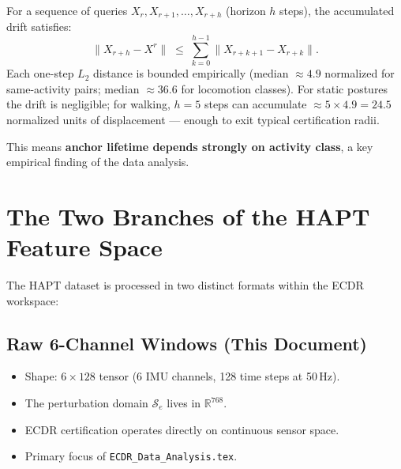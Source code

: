 \documentclass[11pt, a4paper]{article}
\theoremstyle{definition}
\theoremstyle{plain}
\newcommand{\R}{\mathbb{R}}
\newcommand{\Se}{\mathcal{S}_e}
\newcommand{\code}[1]{\texttt{#1}}
\begin{document}
For a sequence of queries $X_{r}, X_{r+1}, \ldots, X_{r+h}$ (horizon $h$ steps),
the accumulated drift satisfies:
\begin{equation}
  \|X_{r+h} - X^r\|
  \;\le\; \sum_{k=0}^{h-1} \|X_{r+k+1} - X_{r+k}\|.
\end{equation}
Each one-step $L_2$ distance is bounded empirically (median $\approx 4.9$ normalized
for same-activity pairs; median $\approx 36.6$ for locomotion classes). For static
postures the drift is negligible; for walking, $h = 5$ steps can accumulate
$\approx 5 \times 4.9 = 24.5$ normalized units of displacement — enough to exit
typical certification radii.

This means \textbf{anchor lifetime depends strongly on activity class}, a key
empirical finding of the data analysis.

\section{The Two Branches of the HAPT Feature Space}

The HAPT dataset is processed in two distinct formats within the ECDR workspace:

\subsection{Raw 6-Channel Windows (This Document)}
\begin{itemize}[leftmargin=1.5em]
  \item Shape: $6 \times 128$ tensor (6 IMU channels, 128 time steps at 50\,Hz).
  \item The perturbation domain $\Se$ lives in $\R^{768}$.
  \item ECDR certification operates directly on continuous sensor space.
  \item Primary focus of \code{ECDR\_Data\_Analysis.tex}.
\end{itemize}
\end{document}
